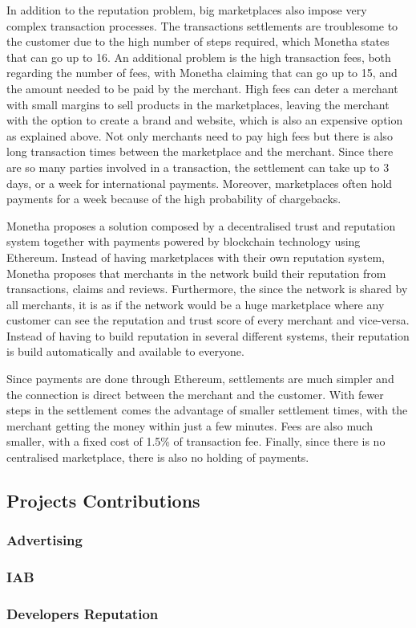 In addition to the reputation problem, big marketplaces also impose very complex transaction processes. The transactions settlements are troublesome to the customer due to the high number of steps required, which Monetha states that can go up to 16. An additional problem is the high transaction fees, both regarding the number of fees, with Monetha claiming that can go up to 15, and the amount needed to be paid by the merchant. High fees can deter a merchant with small margins to sell products in the marketplaces, leaving the merchant with the option to create a brand and website, which is also an expensive option as explained above. Not only merchants need to pay high fees but there is also long transaction times between the marketplace and the merchant. Since there are so many parties involved in a transaction, the settlement can take up to 3 days, or a week for international payments. Moreover, marketplaces often hold payments for a week because of the high probability of chargebacks.

Monetha proposes a solution composed by a decentralised trust and reputation system together with payments powered by blockchain technology using Ethereum. Instead of having marketplaces with their own reputation system, Monetha proposes that merchants in the network build their reputation from transactions, claims and reviews. Furthermore, the since the network is shared by all merchants, it is as if the network would be a huge marketplace where any customer can see the reputation and trust score of every merchant and vice-versa. Instead of having to build reputation in several different systems, their reputation is build automatically and available to everyone.

Since payments are done through Ethereum, settlements are much simpler and the connection is direct between the merchant and the customer. With fewer steps in the settlement comes the advantage of smaller settlement times, with the merchant getting the money within just a few minutes. Fees are also much smaller, with a fixed cost of 1.5\% of transaction fee. Finally, since there is no centralised marketplace, there is also no holding of payments.

\subsection{Projects Contributions}
\subsubsection{Advertising}

\subsubsection{IAB}

\subsubsection{Developers Reputation}






